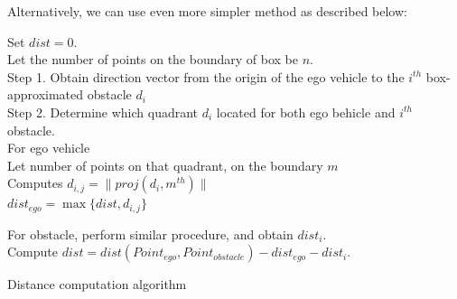 \documentclass[12pt]{article}
\begin{document}
Alternatively, we can use even more simpler method as described below:

\begin{algorithm}
Set $dist=0$.\\
Let the number of points on the boundary of box be $n$.\\

Step 1. Obtain direction vector from the origin of the ego vehicle to the $i^{th}$ box-approximated obstacle $d_i$ \\
Step 2. Determine which quadrant $d_i$ located for both ego behicle and $i^{th}$ obstacle.\\
For ego vehicle\\
		Let number of points on that quadrant, on the boundary $m$\\
   {
  	Computes $d_{i,j}=\|proj(d_i,m^{th}) \|$\\
  }
  $dist_{ego}=\max\{dist,d_{i,j}\}$
 
For obstacle, perform similar procedure, and obtain $dist_i$.\\
Compute $dist=dist(Point_{ego},Point_{obstacle})-dist_{ego}-dist_{i}$.
\caption{Distance computation algorithm}
\end{algorithm}
\end{document}
